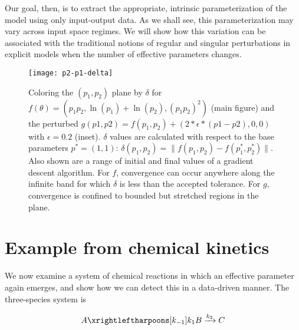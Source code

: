 Our goal, then, is to extract the appropriate, intrinsic
parameterization of the model using only input-output data. As we
shall see, this parameterization may vary across input space regimes.
We will show how this variation can be associated with the traditional
notions of regular and singular perturbations in explicit models when
the number of effective parameters changes.


\begin{figure}
  \centerline{\texttt{[image: p2-p1-delta]}}
  \caption[Illustration of effects of sloppiness on
  optimization]{Coloring the $(p_1, p_2)$ plane by $\delta$ for
    $f(\theta) = (p_1 p_2 , \ln(p_1) + \ln(p_2) , (p_1 p_2)^2)$ (main
    figure) and the perturbed $g(p1, p2) = f(p_1, p_2) +
    \left(2*\epsilon*(p1 - p2), 0, 0\right)$ with $\epsilon = 0.2$
    (inset). $\delta$ values are calculated with respect to the base
    parameters $p^* = (1, 1)$: $\delta(p_1, p_2) = \| f(p_1, p_2) -
    f(p_1^*, p_2^*)\|$. Also shown are a range of initial and final values of
    a gradient descent algorithm. For $f$, convergence can occur
    anywhere along the infinite band for which $\delta$ is less than
    the accepted tolerance. For $g$, convergence is confined to
    bounded but stretched regions in the plane.
    \label{fig:non-id} }
\end{figure}



\section{Example from chemical kinetics} \label{sec:rr}

We now examine a system of chemical reactions in which an effective
parameter again emerges, and show how we can detect this in a
data-driven manner. The three-species system is

\begin{align}
  A
  \xrightleftharpoons[k_{-1}]{k_1}
  B
  \xrightarrow[]{k_2}
  C
  \label{mech:abc}
\end{align}

